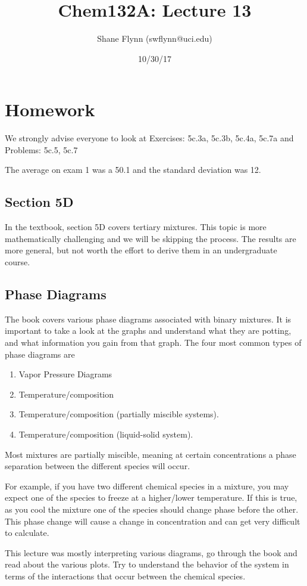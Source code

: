 \documentclass{article}
\title{Chem132A: Lecture 13}
\author{Shane Flynn (swflynn@uci.edu)}
\date{10/30/17}
\newcommand{\benum}{\begin{enumerate}}
\newcommand{\eenum}{\end{enumerate}}
\begin{document}
\maketitle

\section*{Homework}
We strongly advise everyone to look at Exercises: 5c.3a, 5c.3b, 5c.4a, 5c.7a and Problems: 5c.5, 5c.7

The average on exam 1 was a 50.1 and the standard deviation was 12.

\subsection*{Section 5D}
In the textbook, section 5D covers tertiary mixtures.
This topic is more mathematically challenging and we will be skipping the process. 
The results are more general, but not worth the effort to derive them in an undergraduate course. 

\subsection*{Phase Diagrams}
The book covers various phase diagrams associated with binary mixtures.
It is important to take a look at the graphs and understand what they are potting, and what information you gain from that graph. 
The four most common types of phase diagrams are
\benum
\item Vapor Pressure Diagrams
\item Temperature/composition
\item Temperature/composition (partially miscible systems).
\item Temperature/composition (liquid-solid system). 
\eenum

Most mixtures are partially miscible, meaning at certain concentrations a phase separation between the different species will occur. 

For example, if you have two different chemical species in a mixture, you may expect one of the species to freeze at a higher/lower temperature.
If this is true, as you cool the mixture one of the species should change phase before the other. 
This phase change will cause a change in concentration and can get very difficult to calculate. 

This lecture was mostly interpreting various diagrams, go through the book and read about the various plots.
Try to understand the behavior of the system in terms of the interactions that occur between the chemical species.
\end{document}
